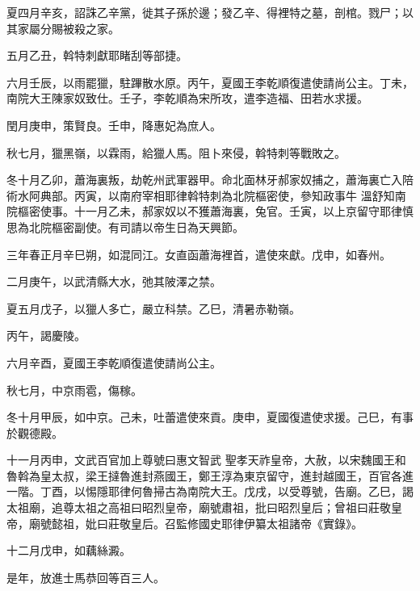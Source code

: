 \begin{pinyinscope}
 夏四月辛亥，詔誅乙辛黨，徙其子孫於邊；發乙辛、得裡特之墓，剖棺。戮尸；以其家屬分賜被殺之家。



 五月乙丑，斡特刺獻耶睹刮等部捷。



 六月壬辰，以雨罷獵，駐蹕散水原。丙午，夏國王李乾順復遣使請尚公主。丁未，南院大王陳家奴致仕。壬子，李乾順為宋所攻，遣李造福、田若水求援。



 閏月庚申，策賢良。壬申，降惠妃為庶人。



 秋七月，獵黑嶺，以霖雨，給獵人馬。阻卜來侵，斡特刺等戰敗之。



 冬十月乙卯，蕭海裏叛，劫乾州武軍器甲。命北面林牙郝家奴捕之，蕭海裏亡入陪術水阿典部。丙寅，以南府宰相耶律斡特刺為北院樞密使，參知政事牛
 溫舒知南院樞密使事。十一月乙未，郝家奴以不獲蕭海裏，兔官。壬寅，以上京留守耶律慎思為北院樞密副使。有司請以帝生日為天興節。



 三年春正月辛巳朔，如混同江。女直函蕭海裡首，遣使來獻。戊申，如春州。



 二月庚午，以武清縣大水，弛其陂澤之禁。



 夏五月戊子，以獵人多亡，嚴立科禁。乙巳，清暑赤勒嶺。



 丙午，謁慶陵。



 六月辛酉，夏國王李乾順復遣使請尚公主。



 秋七月，中京雨雹，傷稼。



 冬十月甲辰，如中京。己未，吐蕾遣使來貢。庚申，夏國復遣使求援。己巳，有事於觀德殿。



 十一月丙申，文武百官加上尊號曰惠文智武
 聖孝天祚皇帝，大赦，以宋魏國王和魯斡為皇太叔，梁王撻魯進封燕國王，鄭王淳為東京留守，進封越國王，百官各進一階。丁酉，以惕隱耶律何魯掃古為南院大王。戊戌，以受尊號，告廟。乙巳，謁太祖廟，追尊太祖之高祖曰昭烈皇帝，廟號肅祖，批曰昭烈皇后；曾祖曰莊敬皇帝，廟號懿祖，妣曰莊敬皇后。召監修國史耶律伊纂太祖諸帝《實錄》。



 十二月戊申，如藕絲澱。



 是年，放進士馬恭回等百三人。




\end{pinyinscope}
